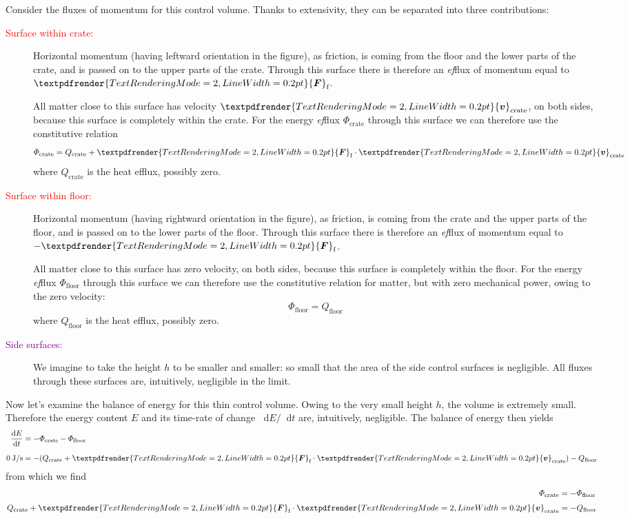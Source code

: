 \documentclass[a4paper,12pt,%
onecolumn,oneside,%
british%
]{memoir}
\renewcommand*{\bm}[1]{\textpdfrender{TextRenderingMode=2,LineWidth=0.2pt}{\boldsymbol{#1}}}
\newcommand*{\di}{\mathop{}\!\mathrm{d}}%
\renewcommand*{\|}[1][]{\nonscript\:#1\vert\nonscript\:\mathopen{}}
\newcommand*{\yv}{\bm{v}}
\newcommand*{\yvc}{\yv_{\textrm{crate}}}
\newcommand*{\dt}{\di t}
\newcommand*{\yE}{E}
\newcommand*{\yH}{\varPhi}%
\newcommand*{\yHfl}{\yH_{\textrm{floor}}}
\newcommand*{\yHc}{\yH_{\textrm{crate}}}
\newcommand*{\yQ}{Q}%
\newcommand*{\yQc}{\yQ_{\textrm{crate}}}
\newcommand*{\yQfl}{\yQ_{\textrm{floor}}}
\newcommand*{\yF}{\bm{F}}
\newcommand*{\yFf}{\yF_{\textrm{f}}}
\begin{document}
Consider the fluxes of momentum for this control volume. Thanks to extensivity, they can be separated into three contributions:
\begin{description}
\item[\textcolor{red}{Surface within crate:}] Horizontal momentum (having leftward orientation in the figure), as friction, is coming from the floor and the lower parts of the crate, and is passed on to the upper parts of the crate. Through this surface there is therefore an \emph{ef}flux of momentum equal to $\yFf$.

All matter close to this surface has velocity $\yvc$, on both sides, because this surface is completely within the crate. For the energy \emph{ef}flux  $\yHc$ through this surface we can therefore use the constitutive relation
\begin{equation*}
  \yHc = \yQc +\yFf\cdot \yvc
\end{equation*}
where $\yQc$ is the heat efflux, possibly zero.

\item[\textcolor{red}{Surface within floor:}] Horizontal momentum (having rightward orientation in the figure), as friction, is coming from the crate and the upper parts of the floor, and is passed on to the lower parts of the floor. Through this surface there is therefore an \emph{ef}flux of momentum equal to $-\yFf$.

  All matter close to this surface has zero velocity, on both sides, because this surface is completely within the floor. For the energy \emph{ef}flux $\yHfl$ through this surface we can therefore use the constitutive relation for matter, but with zero mechanical power, owing to the zero velocity:
\begin{equation*}
  \yHfl = \yQfl
\end{equation*}
where $\yQfl$ is the heat efflux, possibly zero.

\item[\textcolor{purple}{Side surfaces:}] We imagine to take the height $h$ to be smaller and smaller: so small that the area of the side control surfaces is negligible. All fluxes through these surfaces are, intuitively, negligible in the limit.
\end{description}

Now let's examine the balance of energy for this thin control volume. Owing to the very small height $h$, the volume is extremely small. Therefore the energy content $\yE$ and its time-rate of change $\di\yE/\dt$ are, intuitively, negligible. The balance of energy then yields
\begin{equation*}
  \begin{aligned}
    \frac{\di\yE}{\dt} &= -\yHc -\yHfl
    \\[2\jot]
    \qty{0}{J/s}&= - (\yQc + \yFf\cdot \yvc) - \yQfl
  \end{aligned}
\end{equation*}
from which we find
\begin{equation*}
  \begin{aligned}
    \yHc &= -\yHfl \\[\jot]  \yQc + \yFf \cdot \yvc &= -\yQfl
  \end{aligned}
\end{equation*}
\end{document}
